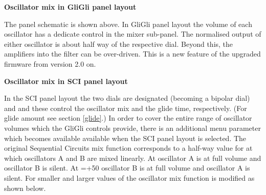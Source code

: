 \textbf{Oscillator mix in GliGli panel layout}

The panel schematic is shown above. In GliGli panel layout the volume of each oscillator has a dedicate control in the mixer sub-panel. The normalised output of either oscillator is about half way of the respective dial. Beyond this, the amplifiers into the filter can be over-driven. This is a new feature of the upgraded firmware from version 2.0 on.

\textbf{Oscillator mix in SCI panel layout}

In the SCI panel layout the two dials are designated \mixer (becoming a bipolar dial) and \glidepot and these control the oscillator mix and the glide time, respectively. (For glide amount see section \ref{glide}.) In order to cover the entire range of oscillator volumes which the GliGli controls provide, there is an additional menu parameter \drive which becomes available available when the SCI panel layout is selected. The original Sequential Circuits mix function corresponds to a half-way value for \drive at which oscillators A and B are mixed linearly. At  oscillator A is at full volume and oscillator B is silent. At \mixer =+50 oscillator B is at full volume and oscillator A is silent.  For smaller and larger values of \drive the oscillator mix function is modified as shown below.


